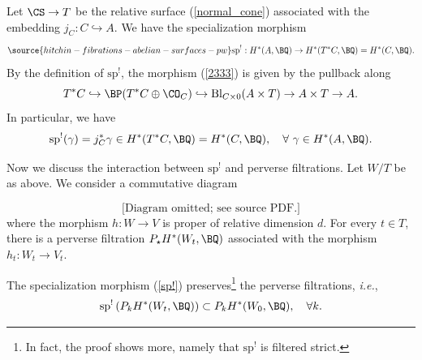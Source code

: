 \begin{example}
\notready\label{example1}
Let $\CS \to T$ be the relative surface (\ref{normal_cone}) associated with the embedding $j_C: C \hookrightarrow A$. We have the specialization morphism
\begin{equation}\label{2333}
\source{hitchin-fibrations-abelian-surfaces-pw}
\mathrm{sp}^!: H^*(A, \BQ) \to H^*(T^*C, \BQ) = H^*(C, \BQ).
\end{equation}
By the definition of $\mathrm{sp}^!$, the morphism (\ref{2333}) is given by the pullback along
\[
T^*C  \hookrightarrow \BP(T^*C \oplus \CO_C) \hookrightarrow \mathrm{Bl}_{C\times 0}(A \times T) \to A\times T \to A.
\]
In particular, we have
\[
\mathrm{sp}^!(\gamma)  = j_C^* \gamma \in H^*(T^*C, \BQ) = H^*(C, \BQ),\quad \forall~ \gamma \in H^*(A, \BQ).
\]
\end{example}

Now we discuss the interaction between $\mathrm{sp}^!$ and perverse filtrations. Let $W/T$ be as above. We consider a commutative diagram

\begin{equation*}
\text{[Diagram omitted; see source PDF.]}
\end{equation*}
where the morphism $h: W \to V$ is proper of relative dimension $d$. For every $t \in T$, there is a perverse filtration $P_\star H^*(W_t, \BQ)$ associated with the morphism $h_t : W_t \to V_t$.

\begin{prop}
\notready\label{Prop3.1}
The specialization morphism (\ref{sp!}) preserves\footnote{{In fact, the proof shows more, namely that $\mathrm{sp}^!$ is filtered strict.}} the perverse filtrations, \emph{i.e.},
\[
\mathrm{sp}^!\left( P_kH^*(W_t, \BQ ) \right) \subset P_k H^*(W_0, \BQ), \quad \forall k.
\]
\end{prop}

